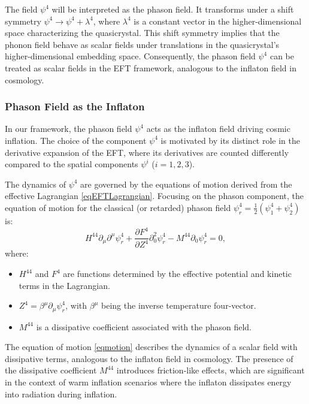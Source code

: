 \documentclass[sn-mathphys-num]{sn-jnl}%
\begin{document}
The field $\psi^4$ will be interpreted as the phason field. It transforms under a shift symmetry $\psi^4 \rightarrow \psi^4 + \lambda^4$, where $\lambda^4$ is a constant vector in the higher-dimensional space characterizing the quasicrystal. This shift symmetry implies that the phonon field behave as scalar fields under translations in the quasicrystal's higher-dimensional embedding space. Consequently, the phason field $\psi^4$ can be treated as scalar fields in the EFT framework, analogous to the inflaton field in cosmology.


\subsubsection{Phason Field as the Inflaton}

In our framework, the phason field $\psi^4$ acts as the inflaton field driving cosmic inflation. The choice of the component $\psi^4$ is motivated by its distinct role in the derivative expansion of the EFT, where its derivatives are counted differently compared to the spatial components $\psi^i$ ($i = 1, 2, 3$).

The dynamics of $\psi^4$ are governed by the equations of motion derived from the effective Lagrangian \eqref{eqEFTLagrangian}. Focusing on the phason component, the equation of motion for the classical (or retarded) phason field $\psi_r^4 = \frac{1}{2} (\psi_1^4 + \psi_2^4)$ is:
\begin{equation} H^{44} \partial_\mu \partial^\mu \psi_r^4 + \frac{\partial F^4}{\partial Z^4} \partial_0^2 \psi_r^4 - M^{44} \partial_0 \psi_r^4 = 0, \label{eqmotion} \end{equation}
where:
\begin{itemize} \item $H^{44}$ and $F^4$ are functions determined by the effective potential and kinetic terms in the Lagrangian. \item $Z^4 = \beta^\mu \partial_\mu \psi_r^4$, with $\beta^\mu$ being the inverse temperature four-vector. \item $M^{44}$ is a dissipative coefficient associated with the phason field. \end{itemize}

The equation of motion \eqref{eqmotion} describes the dynamics of a scalar field with dissipative terms, analogous to the inflaton field in cosmology. The presence of the dissipative coefficient $M^{44}$ introduces friction-like effects, which are significant in the context of warm inflation scenarios where the inflaton dissipates energy into radiation during inflation.
\end{document}
